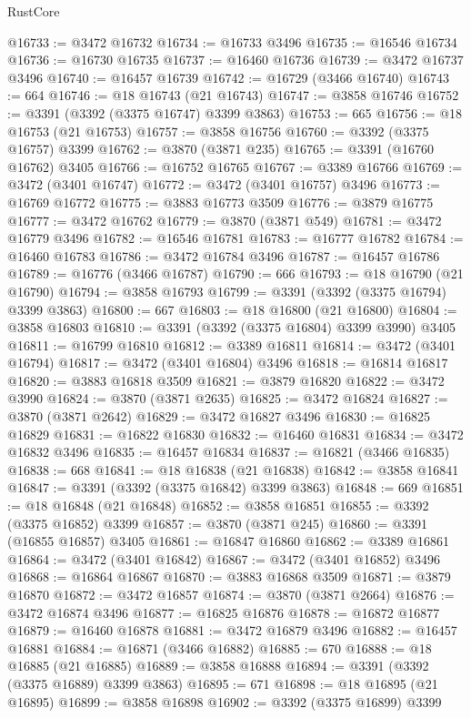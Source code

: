 \begin{lexlean}{RustCore}
\begin{coremodule}
@16733 := @3472 @16732
@16734 := @16733 @3496
@16735 := @16546 @16734
@16736 := @16730 @16735
@16737 := @16460 @16736
@16739 := @3472 @16737 @3496
@16740 := @16457 @16739
@16742 := @16729 (@3466 @16740)
@16743 := 664
@16746 := @18 @16743 (@21 @16743)
@16747 := @3858 @16746
@16752 := @3391 (@3392 (@3375 @16747) @3399 @3863)
@16753 := 665
@16756 := @18 @16753 (@21 @16753)
@16757 := @3858 @16756
@16760 := @3392 (@3375 @16757) @3399
@16762 := @3870 (@3871 @235)
@16765 := @3391 (@16760 @16762) @3405
@16766 := @16752 @16765
@16767 := @3389 @16766
@16769 := @3472 (@3401 @16747)
@16772 := @3472 (@3401 @16757) @3496
@16773 := @16769 @16772
@16775 := @3883 @16773 @3509
@16776 := @3879 @16775
@16777 := @3472 @16762
@16779 := @3870 (@3871 @549)
@16781 := @3472 @16779 @3496
@16782 := @16546 @16781
@16783 := @16777 @16782
@16784 := @16460 @16783
@16786 := @3472 @16784 @3496
@16787 := @16457 @16786
@16789 := @16776 (@3466 @16787)
@16790 := 666
@16793 := @18 @16790 (@21 @16790)
@16794 := @3858 @16793
@16799 := @3391 (@3392 (@3375 @16794) @3399 @3863)
@16800 := 667
@16803 := @18 @16800 (@21 @16800)
@16804 := @3858 @16803
@16810 := @3391 (@3392 (@3375 @16804) @3399 @3990) @3405
@16811 := @16799 @16810
@16812 := @3389 @16811
@16814 := @3472 (@3401 @16794)
@16817 := @3472 (@3401 @16804) @3496
@16818 := @16814 @16817
@16820 := @3883 @16818 @3509
@16821 := @3879 @16820
@16822 := @3472 @3990
@16824 := @3870 (@3871 @2635)
@16825 := @3472 @16824
@16827 := @3870 (@3871 @2642)
@16829 := @3472 @16827 @3496
@16830 := @16825 @16829
@16831 := @16822 @16830
@16832 := @16460 @16831
@16834 := @3472 @16832 @3496
@16835 := @16457 @16834
@16837 := @16821 (@3466 @16835)
@16838 := 668
@16841 := @18 @16838 (@21 @16838)
@16842 := @3858 @16841
@16847 := @3391 (@3392 (@3375 @16842) @3399 @3863)
@16848 := 669
@16851 := @18 @16848 (@21 @16848)
@16852 := @3858 @16851
@16855 := @3392 (@3375 @16852) @3399
@16857 := @3870 (@3871 @245)
@16860 := @3391 (@16855 @16857) @3405
@16861 := @16847 @16860
@16862 := @3389 @16861
@16864 := @3472 (@3401 @16842)
@16867 := @3472 (@3401 @16852) @3496
@16868 := @16864 @16867
@16870 := @3883 @16868 @3509
@16871 := @3879 @16870
@16872 := @3472 @16857
@16874 := @3870 (@3871 @2664)
@16876 := @3472 @16874 @3496
@16877 := @16825 @16876
@16878 := @16872 @16877
@16879 := @16460 @16878
@16881 := @3472 @16879 @3496
@16882 := @16457 @16881
@16884 := @16871 (@3466 @16882)
@16885 := 670
@16888 := @18 @16885 (@21 @16885)
@16889 := @3858 @16888
@16894 := @3391 (@3392 (@3375 @16889) @3399 @3863)
@16895 := 671
@16898 := @18 @16895 (@21 @16895)
@16899 := @3858 @16898
@16902 := @3392 (@3375 @16899) @3399

\end{coremodule}
\end{lexlean}
